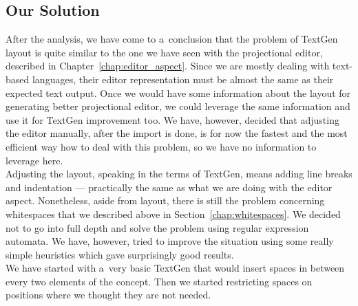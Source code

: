 \subsection{Our Solution}
\label{chap:textgen_solution}

After the analysis, we have come to a~conclusion that the problem of TextGen layout is quite similar to the one we have seen with the projectional editor, described in Chapter~\ref{chap:editor_aspect}.
Since we are mostly dealing with text-based languages, their editor representation must be almost the same as their expected text output.
Once we would have some information about the layout for generating better projectional editor, we could leverage the same information and use it for TextGen improvement too.
We have, however, decided that adjusting the editor manually, after the import is done, is for now the fastest and the most efficient way how to deal with this problem, so we have no information to leverage here.
\\

Adjusting the layout, speaking in the terms of TextGen, means adding line breaks and indentation --- practically the same as what we are doing with the editor aspect.
Nonetheless, aside from layout, there is still the problem concerning whitespaces that we described above in Section~\ref{chap:whitespaces}.
We decided not to go into full depth and solve the problem using regular expression automata.
We have, however, tried to improve the situation using some really simple heuristics which gave surprisingly good results.
\\

We have started with a~very basic TextGen that would insert spaces in between every two elements of the concept.
Then we started restricting spaces on positions where we thought they are not needed.

